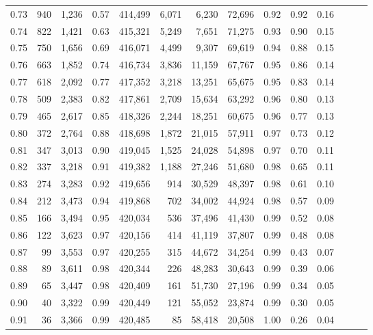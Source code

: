 \begin{tabular}{rrrrrrrrrrrrrr}
0.73 &    940 &  1,236 &  0.57 &  414,499 &    6,071 &   6,230 &  72,696 &  0.92 &  0.92 &      0.16 \\
0.74 &    822 &  1,421 &  0.63 &  415,321 &    5,249 &   7,651 &  71,275 &  0.93 &  0.90 &      0.15 \\
0.75 &    750 &  1,656 &  0.69 &  416,071 &    4,499 &   9,307 &  69,619 &  0.94 &  0.88 &      0.15 \\
0.76 &    663 &  1,852 &  0.74 &  416,734 &    3,836 &  11,159 &  67,767 &  0.95 &  0.86 &      0.14 \\
0.77 &    618 &  2,092 &  0.77 &  417,352 &    3,218 &  13,251 &  65,675 &  0.95 &  0.83 &      0.14 \\
0.78 &    509 &  2,383 &  0.82 &  417,861 &    2,709 &  15,634 &  63,292 &  0.96 &  0.80 &      0.13 \\
0.79 &    465 &  2,617 &  0.85 &  418,326 &    2,244 &  18,251 &  60,675 &  0.96 &  0.77 &      0.13 \\
0.80 &    372 &  2,764 &  0.88 &  418,698 &    1,872 &  21,015 &  57,911 &  0.97 &  0.73 &      0.12 \\
0.81 &    347 &  3,013 &  0.90 &  419,045 &    1,525 &  24,028 &  54,898 &  0.97 &  0.70 &      0.11 \\
0.82 &    337 &  3,218 &  0.91 &  419,382 &    1,188 &  27,246 &  51,680 &  0.98 &  0.65 &      0.11 \\
0.83 &    274 &  3,283 &  0.92 &  419,656 &      914 &  30,529 &  48,397 &  0.98 &  0.61 &      0.10 \\
0.84 &    212 &  3,473 &  0.94 &  419,868 &      702 &  34,002 &  44,924 &  0.98 &  0.57 &      0.09 \\
0.85 &    166 &  3,494 &  0.95 &  420,034 &      536 &  37,496 &  41,430 &  0.99 &  0.52 &      0.08 \\
0.86 &    122 &  3,623 &  0.97 &  420,156 &      414 &  41,119 &  37,807 &  0.99 &  0.48 &      0.08 \\
0.87 &     99 &  3,553 &  0.97 &  420,255 &      315 &  44,672 &  34,254 &  0.99 &  0.43 &      0.07 \\
0.88 &     89 &  3,611 &  0.98 &  420,344 &      226 &  48,283 &  30,643 &  0.99 &  0.39 &      0.06 \\
0.89 &     65 &  3,447 &  0.98 &  420,409 &      161 &  51,730 &  27,196 &  0.99 &  0.34 &      0.05 \\
0.90 &     40 &  3,322 &  0.99 &  420,449 &      121 &  55,052 &  23,874 &  0.99 &  0.30 &      0.05 \\
0.91 &     36 &  3,366 &  0.99 &  420,485 &       85 &  58,418 &  20,508 &  1.00 &  0.26 &      0.04 \\

\end{tabular}
